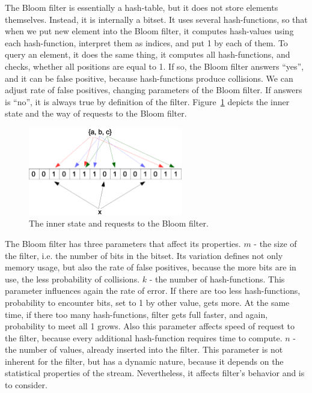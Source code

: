 The Bloom filter is essentially a hash-table, but it does not store elements themselves.
Instead, it is internally a bitset.
It uses several hash-functions, so that when we put new element into the Bloom filter, it computes hash-values using each hash-function, interpret them as indices, and put 1 by each of them.
To query an element, it does the same thing, it computes all hash-functions, and checks, whether all positions are equal to 1.
If so, the Bloom filter answers ``yes'', and it can be false positive, because hash-functions produce collisions.
We can adjust rate of false positives, changing parameters of the Bloom filter.
If answers is ``no'', it is always true by definition of the filter.
Figure~\ref{fig:bloom_filter} depicts the inner state and the way of requests to the Bloom filter.

\begin{figure}[h]
  \centering
  \includegraphics [width=0.6\textwidth]{images/BloomFilter}
  \caption{The inner state and requests to the Bloom filter.}
  \label{fig:bloom_filter}
\end{figure}

The Bloom filter has three parameters that affect its properties.
$m$ - the size of the filter, i.e. the number of bits in the bitset.
Its variation defines not only memory usage, but also the rate of false positives, because the more bits are in use, the less probability of collisions.
$k$ - the number of hash-functions.
This parameter influences again the rate of error.
If there are too less hash-functions, probability to encounter bits, set to 1 by other value, gets more.
At the same time, if there too many hash-functions, filter gets full faster, and again, probability to meet all 1 grows.
Also this parameter affects speed of request to the filter, because every additional hash-function requires time to compute.
$n$ - the number of values, already inserted into the filter.
This parameter is not inherent for the filter, but has a dynamic nature, because it depends on the statistical properties of the stream.
Nevertheless, it affects filter's behavior and is to consider.

